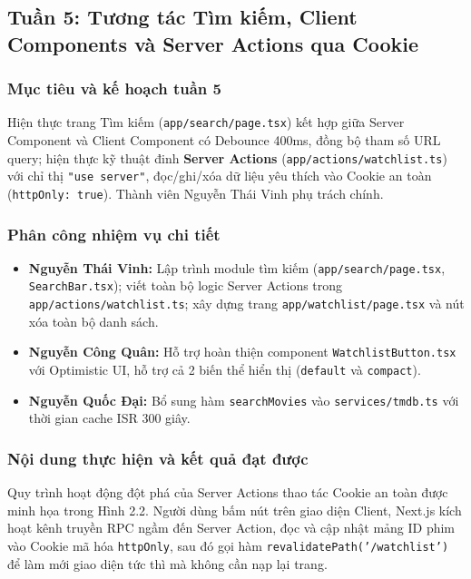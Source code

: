 \documentclass[13pt,a4paper]{extarticle}
\begin{document}
\subsection{Tuần 5: Tương tác Tìm kiếm, Client Components và Server Actions qua Cookie}

\subsubsection{Mục tiêu và kế hoạch tuần 5}
Hiện thực trang Tìm kiếm (\texttt{app/search/page.tsx}) kết hợp giữa Server Component và Client Component có Debounce 400ms, đồng bộ tham số URL query; hiện thực kỹ thuật đinh \textbf{Server Actions} (\texttt{app/actions/watchlist.ts}) với chỉ thị \texttt{"use server"}, đọc/ghi/xóa dữ liệu yêu thích vào Cookie an toàn (\texttt{httpOnly: true}). Thành viên Nguyễn Thái Vinh phụ trách chính.

\subsubsection{Phân công nhiệm vụ chi tiết}
\begin{itemize}[noitemsep]
    \item \textbf{Nguyễn Thái Vinh:} Lập trình module tìm kiếm (\texttt{app/search/page.tsx}, \texttt{SearchBar.tsx}); viết toàn bộ logic Server Actions trong \texttt{app/actions/watchlist.ts}; xây dựng trang \texttt{app/watchlist/page.tsx} và nút xóa toàn bộ danh sách.
    \item \textbf{Nguyễn Công Quân:} Hỗ trợ hoàn thiện component \texttt{WatchlistButton.tsx} với Optimistic UI, hỗ trợ cả 2 biến thể hiển thị (\texttt{default} và \texttt{compact}).
    \item \textbf{Nguyễn Quốc Đại:} Bổ sung hàm \texttt{searchMovies} vào \texttt{services/tmdb.ts} với thời gian cache ISR 300 giây.
\end{itemize}

\subsubsection{Nội dung thực hiện và kết quả đạt được}
Quy trình hoạt động đột phá của Server Actions thao tác Cookie an toàn được minh họa trong Hình 2.2. Người dùng bấm nút trên giao diện Client, Next.js kích hoạt kênh truyền RPC ngầm đến Server Action, đọc và cập nhật mảng ID phim vào Cookie mã hóa \texttt{httpOnly}, sau đó gọi hàm \texttt{revalidatePath('/watchlist')} để làm mới giao diện tức thì mà không cần nạp lại trang.
\end{document}
